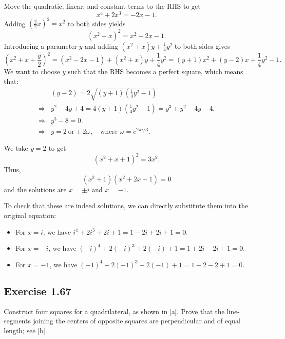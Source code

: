 \documentclass{article}
\begin{document}
\begin{solution}
  Move the quadratic, linear, and constant terms to the RHS to get
  \[
    x^4 + 2x^3 = -2x - 1.
  \]
  Adding $(\frac{2}{2}x)^2 = x^2$ to both sides yields
  \[
    (x^2 + x)^2 = x^2 - 2x - 1.
  \]
  Introducing a parameter $y$ and adding $(x^2 + x)y +
  \frac{1}{4}y^2$ to both sides gives
  \[
    (x^2 + x + \frac{y}{2})^2 = (x^2 - 2x - 1) + (x^2 + x)y + \frac{1}{4}y^2
    = (y+1) x^2 + (y - 2)x + \frac{1}{4}y^2 - 1.
  \]
  We want to choose $y$ such that the RHS becomes a perfect square,
  which means that:
  \[
    \begin{aligned}
      &(y-2) = 2 \sqrt{(y+1)(\frac{1}{4}y^2-1)} \\
      \Rightarrow& y^2 - 4y + 4 = 4(y+1)(\frac{1}{4}y^2-1) = y^3+y^2-4y-4. \\
      \Rightarrow& y^3 - 8 = 0. \\
      \Rightarrow& y = 2 \ \text{or} \pm 2\omega, \quad \text{where }
      \omega = e^{2\pi i/3}.
    \end{aligned}
  \]

  We take $y = 2$ to get
  \[
    (x^2 + x + 1)^2 = 3x^2.
  \]
  Thus, \[
    (x^2 + 1)(x^2 + 2x + 1) = 0
  \]
  and the solutions are $x = \pm i$ and $x = -1$.

  To check that these are indeed solutions, we can directly substitute them
  into the original equation:
  \begin{itemize}
    \item For $x = i$, we have $i^4 + 2i^3 + 2i + 1 = 1 - 2i + 2i + 1 = 0$.
    \item For $x = -i$, we have $(-i)^4 + 2(-i)^3 + 2(-i) + 1 = 1 +
      2i - 2i + 1 = 0$.
    \item For $x = -1$, we have $(-1)^4 + 2(-1)^3 + 2(-1) + 1 = 1 - 2
      - 2 + 1 = 0$.
  \end{itemize}

\end{solution}

\subsection{Exercise 1.67}
Construct four squares for a quadrilateral, as shown in [a]. Prove
that the line-segments joining the centers of opposite squares are
perpendicular and of equal length; see [b].
\end{document}
